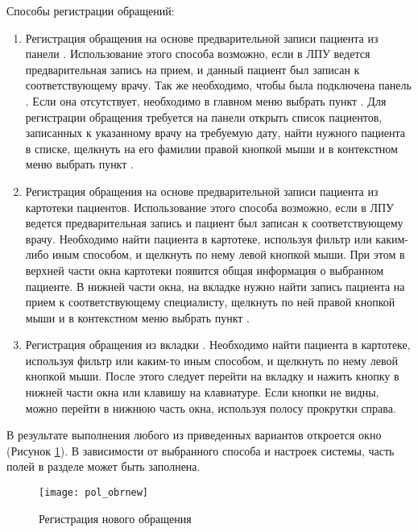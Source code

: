 Способы регистрации обращений:
\begin{enumerate}
 \item Регистрация обращения на основе предварительной записи пациента из панели . Использование этого способа возможно, если в ЛПУ ведется предварительная запись на прием, и данный пациент был записан к соответствующему врачу. Так же необходимо, чтобы была подключена панель . Если она отсутствует, необходимо в главном меню выбрать пункт . Для регистрации обращения требуется на панели  открыть список пациентов, записанных к указанному врачу на требуемую дату, найти нужного пациента в списке, щелкнуть на его фамилии правой кнопкой мыши и в контекстном меню выбрать пункт .
 \item Регистрация обращения на основе предварительной записи пациента из картотеки пациентов. Использование этого способа возможно, если в ЛПУ ведется предварительная запись и пациент был записан к соответствующему врачу. Необходимо найти пациента в картотеке, используя фильтр или каким-либо иным способом, и щелкнуть по нему левой кнопкой мыши. При этом в верхней части окна картотеки появится общая информация о выбранном пациенте. В нижней части окна, на вкладке  нужно найти запись пациента на прием к соответствующему специалисту, щелкнуть по ней правой кнопкой мыши и в контекстном меню выбрать пункт .
 \item Регистрация обращения из вкладки . Необходимо найти пациента в картотеке, используя фильтр или каким-то иным способом, и щелкнуть по нему левой кнопкой мыши. После этого следует перейти на вкладку  и нажить кнопку  в нижней части окна или клавишу  на клавиатуре. Если кнопки не видны, можно перейти в нижнюю часть окна, используя полосу прокрутки справа.
\end{enumerate}
 
В результате выполнения любого из приведенных вариантов откроется окно  (Рисунок \ref{img_pol_obrnew}). В зависимости от выбранного способа и настроек системы, часть полей в разделе  может быть заполнена.

\begin{figure}[ht]\centering
 \texttt{[image: pol\_obrnew]}
 \caption{Регистрация нового обращения}
 \label{img_pol_obrnew}
\end{figure}

